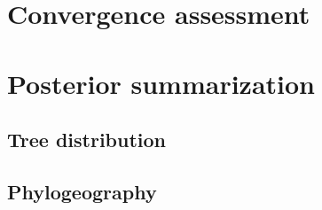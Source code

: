 \section{Convergence assessment}

\section{Posterior summarization}

\subsection{Tree distribution}

\subsection{Phylogeography}



\cleardoublepage

